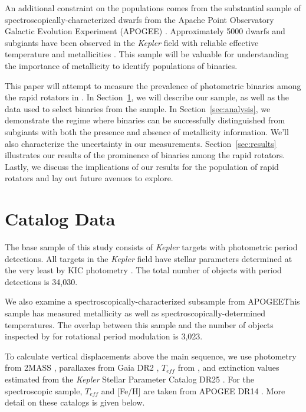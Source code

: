 \documentclass[manuscript]{aastex6}
\newcommand{\Kepler}{\mbox{\textit{Kepler}}}
\newcommand{\Teff}{\ensuremath{T_{eff}}}
\begin{document}
An additional constraint on the populations comes from the substantial sample
of spectroscopically-characterized dwarfs from the Apache Point Observatory
Galactic Evolution Experiment (APOGEE) \citep{Majewski17}. Approximately 5000 dwarfs and subgiants
have been observed in the \Kepler{} field with reliable effective temperature
and metallicities \citep{Holtzmann18}. This sample will be valuable for
understanding the importance of metallicity to identify populations of
binaries.

This paper will attempt to measure the prevalence of photometric binaries among
the rapid rotators in \citet{McQuillan14}. In Section~\ref{sec:data}, we will 
describe our sample, as well as the data used to select binaries from the 
sample. In Section~\ref{sec:analysis}, we demonstrate the regime where 
binaries can be successfully distinguished from subgiants with both the 
presence and absence of metallicity information. We'll also characterize the 
uncertainty in our measurements. Section~\ref{sec:results} illustrates our 
results of the prominence of binaries among the rapid rotators. Lastly, we 
discuss the implications of our results for the population of rapid rotators 
and lay out future avenues to explore.

\section{Catalog Data}
\label{sec:data}

The base sample of this study consists of \Kepler{} targets with photometric
period detections. All targets in the \Kepler{} field have stellar parameters
determined at the very least by KIC photometry \citep{Brown11}. The total
number of objects with period detections is 34,030.

We also examine a spectroscopically-characterized subsample from APOGEE\. This
sample has measured metallicity as well as spectroscopically-determined
temperatures. The overlap between this sample and the number of objects
inspected by \citet{McQuillan14} for rotational period modulation is 3,023.

To calculate vertical displacements above the main sequence, we use photometry
from 2MASS \citep{Skrutskie06}, parallaxes from Gaia DR2 \citep{Gaia18},
\Teff{} from \citet{Pinsonneault12}, and extinction values estimated from the 
\Kepler{} Stellar Parameter Catalog DR25 \citep[KSPC]{Huber14,Mathur17}. 
For the spectroscopic sample, \Teff{} and [Fe/H] are taken from APOGEE DR14 
\citep{Abolfathi18}. More detail on these catalogs is given below.
\end{document}
